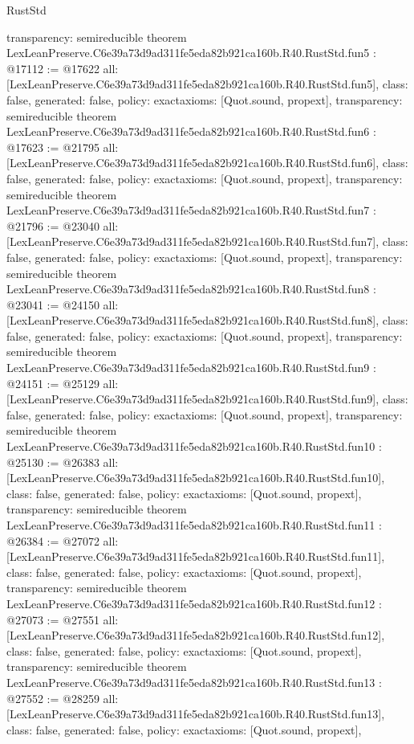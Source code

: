 \begin{lexlean}{RustStd}
\begin{coremodule}
{  transparency: semireducible
}
theorem LexLeanPreserve.C6e39a73d9ad311fe5eda82b921ca160b.R40.RustStd.fun5 : @17112 := @17622 {
  all: [LexLeanPreserve.C6e39a73d9ad311fe5eda82b921ca160b.R40.RustStd.fun5],
  class: false,
  generated: false,
  policy: exact{axioms: [Quot.sound, propext]},
  transparency: semireducible
}
theorem LexLeanPreserve.C6e39a73d9ad311fe5eda82b921ca160b.R40.RustStd.fun6 : @17623 := @21795 {
  all: [LexLeanPreserve.C6e39a73d9ad311fe5eda82b921ca160b.R40.RustStd.fun6],
  class: false,
  generated: false,
  policy: exact{axioms: [Quot.sound, propext]},
  transparency: semireducible
}
theorem LexLeanPreserve.C6e39a73d9ad311fe5eda82b921ca160b.R40.RustStd.fun7 : @21796 := @23040 {
  all: [LexLeanPreserve.C6e39a73d9ad311fe5eda82b921ca160b.R40.RustStd.fun7],
  class: false,
  generated: false,
  policy: exact{axioms: [Quot.sound, propext]},
  transparency: semireducible
}
theorem LexLeanPreserve.C6e39a73d9ad311fe5eda82b921ca160b.R40.RustStd.fun8 : @23041 := @24150 {
  all: [LexLeanPreserve.C6e39a73d9ad311fe5eda82b921ca160b.R40.RustStd.fun8],
  class: false,
  generated: false,
  policy: exact{axioms: [Quot.sound, propext]},
  transparency: semireducible
}
theorem LexLeanPreserve.C6e39a73d9ad311fe5eda82b921ca160b.R40.RustStd.fun9 : @24151 := @25129 {
  all: [LexLeanPreserve.C6e39a73d9ad311fe5eda82b921ca160b.R40.RustStd.fun9],
  class: false,
  generated: false,
  policy: exact{axioms: [Quot.sound, propext]},
  transparency: semireducible
}
theorem LexLeanPreserve.C6e39a73d9ad311fe5eda82b921ca160b.R40.RustStd.fun10 : @25130 := @26383 {
  all: [LexLeanPreserve.C6e39a73d9ad311fe5eda82b921ca160b.R40.RustStd.fun10],
  class: false,
  generated: false,
  policy: exact{axioms: [Quot.sound, propext]},
  transparency: semireducible
}
theorem LexLeanPreserve.C6e39a73d9ad311fe5eda82b921ca160b.R40.RustStd.fun11 : @26384 := @27072 {
  all: [LexLeanPreserve.C6e39a73d9ad311fe5eda82b921ca160b.R40.RustStd.fun11],
  class: false,
  generated: false,
  policy: exact{axioms: [Quot.sound, propext]},
  transparency: semireducible
}
theorem LexLeanPreserve.C6e39a73d9ad311fe5eda82b921ca160b.R40.RustStd.fun12 : @27073 := @27551 {
  all: [LexLeanPreserve.C6e39a73d9ad311fe5eda82b921ca160b.R40.RustStd.fun12],
  class: false,
  generated: false,
  policy: exact{axioms: [Quot.sound, propext]},
  transparency: semireducible
}
theorem LexLeanPreserve.C6e39a73d9ad311fe5eda82b921ca160b.R40.RustStd.fun13 : @27552 := @28259 {
  all: [LexLeanPreserve.C6e39a73d9ad311fe5eda82b921ca160b.R40.RustStd.fun13],
  class: false,
  generated: false,
  policy: exact{axioms: [Quot.sound, propext]},
}
\end{coremodule}
\end{lexlean}
